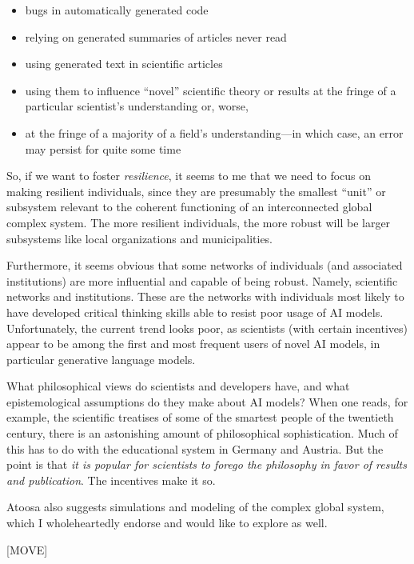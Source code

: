 \documentclass[11pt, oneside]{article}   	%
\begin{document}
\begin{itemize}
    \item bugs in automatically generated code
    \item relying on generated summaries of articles never read
    \item using generated text in scientific articles
    \item using them to influence ``novel'' scientific theory or results at the fringe of a particular scientist's understanding or, worse, 
    \item at the fringe of a majority of a field's understanding---in which case, an error may persist for quite some time
\end{itemize}

So, if we want to foster \emph{resilience}, it seems to me that we need to focus on making resilient individuals, since they are presumably the smallest ``unit'' or subsystem relevant to the coherent functioning of an interconnected global complex system.  The more resilient individuals, the more robust will be larger subsystems like local organizations and municipalities.

Furthermore, it seems obvious that some networks of individuals (and associated institutions) are more influential and capable of being robust.  Namely, scientific networks and institutions.  These are the networks with individuals most likely to have developed critical thinking skills able to resist poor usage of AI models.  Unfortunately, the current trend looks poor, as scientists (with certain incentives) appear to be among the first and most frequent users of novel AI models, in particular generative language models.

What philosophical views do scientists and developers have, and what epistemological assumptions do they make about AI models?  When one reads, for example, the scientific treatises of some of the smartest people of the twentieth century, there is an astonishing amount of philosophical sophistication.  Much of this has to do with the educational system in Germany and Austria.  But the point is that \emph{it is popular for scientists to forego the philosophy in favor of results and publication}.  The incentives make it so.

Atoosa also suggests simulations and modeling of the complex global system, which I wholeheartedly endorse and would like to explore as well.  



[MOVE]
\end{document}
